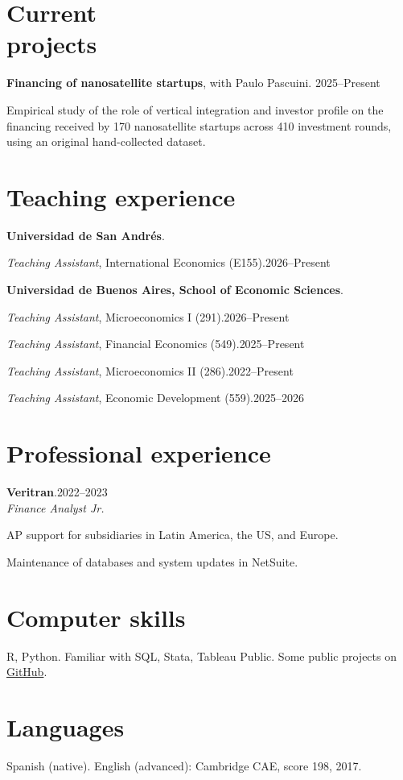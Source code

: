 \documentclass[11pt]{article}
\newcommand{\entrydate}[1]{\hfill{\small{#1}}}
\begin{document}
\section{Current\\projects}
\textbf{Financing of nanosatellite startups}, with Paulo Pascuini. \entrydate{2025--Present}
\begin{cvitems}
  \item Empirical study of the role of vertical integration and investor profile on the financing received by 170 nanosatellite startups across 410 investment rounds, using an original hand-collected dataset.
\end{cvitems}

\section{Teaching experience}
\textbf{Universidad de San Andrés}.
\begin{cvitems}
  \item \textit{Teaching Assistant}, International Economics (E155).\entrydate{2026--Present}
\end{cvitems}

\textbf{Universidad de Buenos Aires, School of Economic Sciences}.
\begin{cvitems}
  \item \textit{Teaching Assistant}, Microeconomics I (291).\entrydate{2026--Present}
  \item \textit{Teaching Assistant}, Financial Economics (549).\entrydate{2025--Present}
  \item \textit{Teaching Assistant}, Microeconomics II (286).\entrydate{2022--Present}
  \item \textit{Teaching Assistant}, Economic Development (559).\entrydate{2025--2026}
\end{cvitems}

\section{Professional experience}
\textbf{Veritran}.\entrydate{2022--2023}\\
\textit{Finance Analyst Jr.}
\begin{cvitems}
  \item AP support for subsidiaries in Latin America, the US, and Europe.
  \item Maintenance of databases and system updates in NetSuite.
\end{cvitems}

\section{Computer skills}
    R, Python. Familiar with SQL, Stata, Tableau Public. Some public projects on \href{https://www.github.com/sanarovaz/}{GitHub}.
\section{Languages}
Spanish (native). English (advanced): Cambridge CAE, score 198, 2017.
\end{document}
